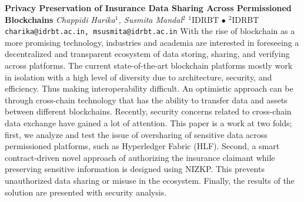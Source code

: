 
    \begin{conf-abstract}[]
        {\textbf{Privacy Preservation of Insurance Data Sharing Across Permissioned Blockchains}}
        {\textit{Chappidi Harika$^{1}$, Susmita Mandal$^{2}$}}
        {$^{1}$IDRBT $\bullet$ $^{2}$IDRBT}
        {\texttt{charika@idrbt.ac.in, msusmita@idrbt.ac.in}}
        {With the rise of blockchain as a more promising technology, industries and academia are interested in foreseeing a decentralized and transparent ecosystem of data storing, sharing, and verifying across platforms. The current state-of-the-art blockchain platforms mostly work in isolation with a high level of diversity due to architecture, security, and efficiency. Thus making interoperability difficult. An optimistic approach can be through cross-chain technology that has the ability to transfer data and assets between different blockchains. Recently, security concerns related to cross-chain data exchange have gained a lot of attention. This paper is a work at two folds; first, we analyze and test the issue of oversharing of sensitive data across permissioned platforms, such as Hyperledger Fabric (HLF). Second, a smart contract-driven novel approach of authorizing the insurance claimant while preserving sensitive information is designed using NIZKP. This prevents unauthorized data sharing or misuse in the ecosystem. Finally, the results of the solution are presented with security analysis.}
    \end{conf-abstract}
        